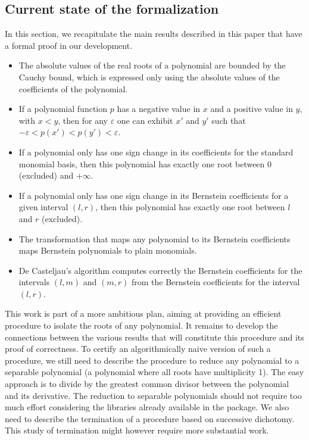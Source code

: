 \documentclass{mscs}
\begin{document}
\subsection{Current state of the formalization}
In this section, we recapitulate the main results described in this paper
that have a formal proof in our development.
\begin{itemize}
\item The absolute values of the real roots of a polynomial are bounded
  by the Cauchy bound, which is expressed only using the absolute
  values of the coefficients of the polynomial.
\item If a polynomial function \(p\)
has a negative value in \(x\) and a positive
value in \(y\), with \(x < y\), then for any \(\varepsilon\) one can
exhibit \(x'\) and \(y'\) such that \(-\varepsilon < p(x') < p(y') < \varepsilon\).
\item If a polynomial only has one sign change in its coefficients for the
standard monomial basis, then this polynomial has exactly one root between
\(0\) (excluded) and \(+\infty\).
\item If a polynomial only has one sign change in its Bernstein coefficients
for a given interval \((l,r)\), then this polynomial has exactly one root
between \(l\) and \(r\) (excluded).
\item The transformation that maps any polynomial to its Bernstein
  coefficients maps Bernstein polynomials to plain monomials.
\item De Casteljau's algorithm computes correctly the Bernstein coefficients
for the intervals \((l,m)\) and \((m,r)\) from the Bernstein coefficients
for the interval \((l,r)\).
\end{itemize}
This work is part of a more ambitious plan, aiming at providing an
efficient procedure
to isolate the roots of any polynomial.  It remains to develop the connections
between the various results that will constitute this procedure and its proof
of correctness. To certify an algorithmically naive version of such a
procedure, we still need to describe the procedure to reduce any
polynomial to a separable polynomial (a polynomial where all roots
have multiplicity 1).  The easy approach is to divide by the greatest common divisor
between the polynomial and its derivative. The reduction to separable
polynomials should not require too much effort considering the
libraries already available in the \ssr{} package.    We also need to describe the termination
of a procedure based on successive dichotomy.  This study of
termination might however require more substantial work.
\end{document}
